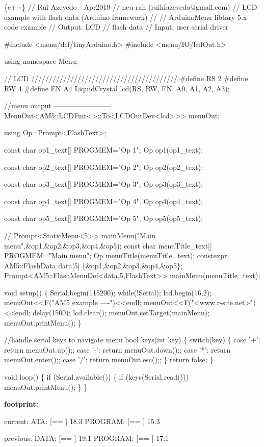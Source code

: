 \begin{DoxyCode}
\{c++\}
// Rui Azevedo - Apr2019
// neu-rah (ruihfazevedo@gmail.com)
// LCD example with flash data (Arduino framework)
//
// ArduinoMenu libtary 5.x code example
// Output: LCD
// flash data
// Input: user serial driver

#include <menu/def/tinyArduino.h>
#include <menu/IO/lcdOut.h>

using namespace Menu;

// LCD /////////////////////////////////////////
#define RS 2
#define RW 4
#define EN A4
LiquidCrystal lcd(RS, RW, EN, A0, A1, A2, A3);

//menu output ------------------------
MenuOut<AM5::LCDFmt<>::To<LCDOutDev<lcd>>> menuOut;

using Op=Prompt<FlashText>;

const char op1\_text[] PROGMEM="Op 1";
Op op1(op1\_text);

const char op2\_text[] PROGMEM="Op 2";
Op op2(op2\_text);

const char op3\_text[] PROGMEM="Op 3";
Op op3(op3\_text);

const char op4\_text[] PROGMEM="Op 4";
Op op4(op4\_text);

const char op5\_text[] PROGMEM="Op 5";
Op op5(op5\_text);

// Prompt<StaticMenu<5>> mainMenu("Main menu",&op1,&op2,&op3,&op4,&op5);
const char menuTitle\_text[] PROGMEM="Main menu";
Op menuTitle(menuTitle\_text);
constexpr AM5::FlashData data[5] \{&op1,&op2,&op3,&op4,&op5\};
Prompt<AM5::FlashMenuDef<data,5,FlashText>> mainMenu(menuTitle\_text);

void setup() \{
  Serial.begin(115200);
  while(!Serial);
  lcd.begin(16,2);
  menuOut<<F("AM5 example ----")<<endl;
  menuOut<<F("<www.r-site.net>")<<endl;
  delay(1500);
  lcd.clear();
  menuOut.setTarget(mainMenu);
  menuOut.printMenu();
\}

//handle serial keys to navigate menu
bool keys(int key) \{
  switch(key) \{
    case '+': return menuOut.up();;
    case '-': return menuOut.down();;
    case '*': return menuOut.enter();;
    case '/': return menuOut.esc();;
  \}
  return false;
\}

void loop() \{
  if (Serial.available()) \{
    if (keys(Serial.read())) menuOut.printMenu();
  \}
\}
\end{DoxyCode}


{\bfseries footprint\+:} 
\begin{DoxyCode}
current:
ATA:    [==        ]  18.3%
PROGRAM: [==        ]  15.3%

previous:
DATA:    [==        ]  19.1%
PROGRAM: [==        ]  17.1%
\end{DoxyCode}


